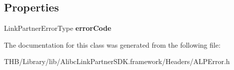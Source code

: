 \subsection*{Properties}
\begin{DoxyCompactItemize}
\item 
\mbox{\label{interface_a_l_p_error_a9212ab6462b9279b75d483495aee0d2b}} 
Link\+Partner\+Error\+Type {\bfseries error\+Code}
\end{DoxyCompactItemize}


The documentation for this class was generated from the following file\+:\begin{DoxyCompactItemize}
\item 
T\+H\+B/\+Library/lib/\+Alibc\+Link\+Partner\+S\+D\+K.\+framework/\+Headers/A\+L\+P\+Error.\+h\end{DoxyCompactItemize}
